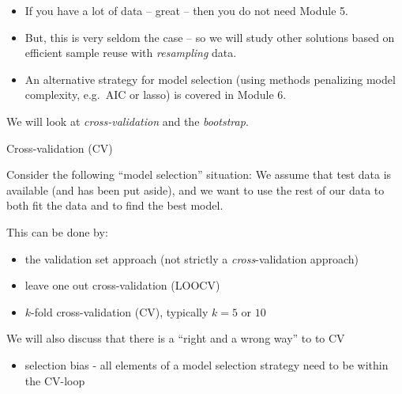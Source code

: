 \documentclass[10pt,ignorenonframetext,]{beamer}
\providecommand{\tightlist}{%
  \setlength{\itemsep}{0pt}\setlength{\parskip}{0pt}}
\begin{document}
\begin{frame}

\begin{itemize}
\item
  If you have a lot of data -- great -- then you do not need Module 5.
\item
  But, this is very seldom the case -- so we will study other solutions
  based on efficient sample reuse with \emph{resampling} data.
\item
  An alternative strategy for model selection (using methods penalizing
  model complexity, e.g.~AIC or lasso) is covered in Module 6.
\end{itemize}

We will look at \emph{cross-validation} and the \emph{bootstrap}.

\end{frame}

\begin{frame}{Cross-validation (CV)}

Consider the following ``model selection'' situation: We assume that
test data is available (and has been put aside), and we want to use the
rest of our data to both fit the data and to find the best model.

This can be done by:

\begin{itemize}
\tightlist
\item
  the validation set approach (not strictly a \emph{cross}-validation
  approach)
\item
  leave one out cross-validation (LOOCV)
\item
  \(k\)-fold cross-validation (CV), typically \(k=5\) or \(10\)
\end{itemize}

We will also discuss that there is a ``right and a wrong way'' to to CV

\begin{itemize}
\tightlist
\item
  selection bias - all elements of a model selection strategy need to be
  within the CV-loop
\end{itemize}

\end{frame}
\end{document}
